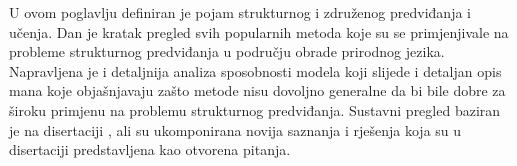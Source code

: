U ovom poglavlju definiran je pojam strukturnog i združenog predviđanja i
učenja. Dan je kratak pregled svih popularnih metoda koje su se primjenjivale na
probleme strukturnog predviđanja u području obrade prirodnog jezika. Napravljena
je i detaljnija analiza sposobnosti modela koji slijede i detaljan opis mana
koje objašnjavaju zašto metode nisu dovoljno generalne da bi bile dobre za
široku primjenu na problemu strukturnog predviđanja. Sustavni pregled baziran je
na disertaciji \citep{daume06thesis}, ali su ukomponirana novija saznanja i
rješenja koja su u disertaciji predstavljena kao otvorena pitanja.
